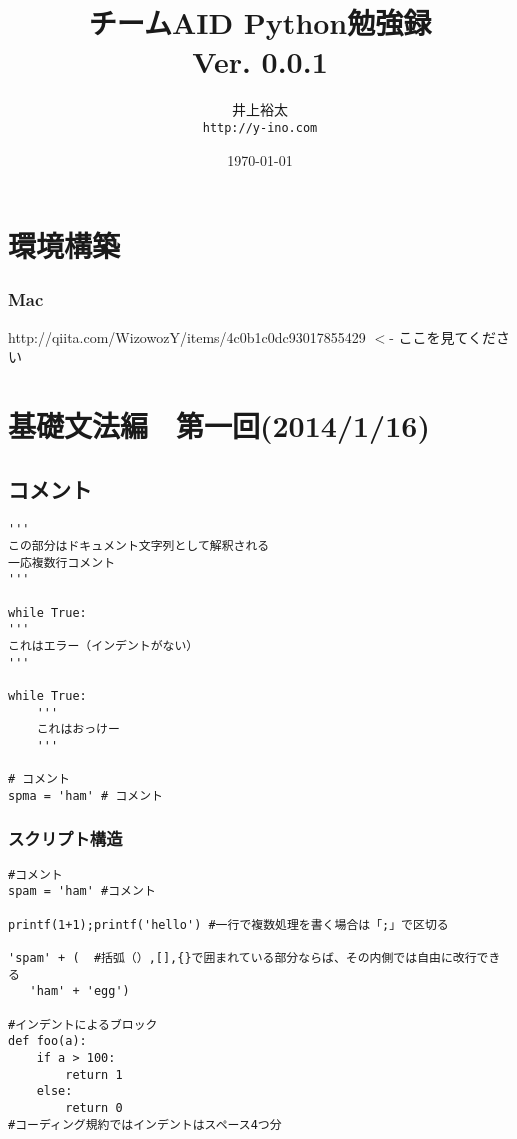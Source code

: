 \documentclass[a4j,here,10pt,oneside,openany]{jsbook}
\title{{\Huge \textbf{チームAID Python勉強録}}\\ {\small Ver. 0.0.1}}
\author{井上裕太\\ \texttt{http://y-ino.com}}
\date{\today}
\begin{document}
%
%
\maketitle
\frontmatter
\tableofcontents
%
%
\mainmatter
\chapter{環境構築}
\subsection{Mac}
http://qiita.com/WizowozY/items/4c0b1c0dc93017855429 $<$- ここを見てください
\chapter{基礎文法編　第一回(2014/1/16)}
\begin{abstract}
\end{abstract}
\section{コメント}
\begin{framed}
\begin{verbatim}
'''
この部分はドキュメント文字列として解釈される
一応複数行コメント
'''

while True:
'''
これはエラー（インデントがない）
'''

while True:
    '''
    これはおっけー
    '''

# コメント
spma = 'ham' # コメント
\end{verbatim}
\end{framed}

\subsection{スクリプト構造}\label{ux30b9ux30afux30eaux30d7ux30c8ux69cbux9020}
\begin{framed}
\begin{verbatim}
#コメント
spam = 'ham' #コメント

printf(1+1);printf('hello') #一行で複数処理を書く場合は「;」で区切る

'spam' + (  #括弧（）,[],{}で囲まれている部分ならば、その内側では自由に改行できる
   'ham' + 'egg')

#インデントによるブロック
def foo(a):
    if a > 100:
        return 1
    else:
        return 0
#コーディング規約ではインデントはスペース4つ分
\end{verbatim}
\end{framed}
\end{document}
